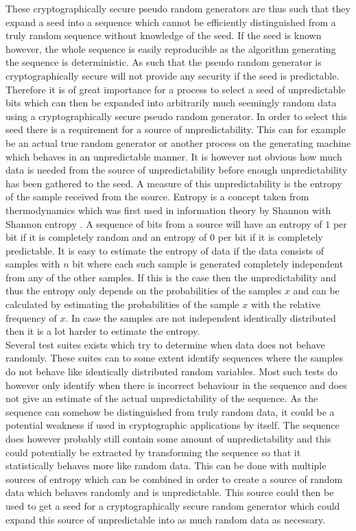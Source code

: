 \documentclass[a4paper,11pt]{report}
\begin{document}
\noindent
These cryptographically secure pseudo random generators are thus such that 
they expand a seed into a sequence which cannot be efficiently distinguished 
from a truly random sequence without knowledge of the seed. If the seed is 
known however, the whole sequence is easily reproducible as the algorithm 
generating the sequence is deterministic. As such that the pseudo random
generator is cryptographically secure will not provide any security if the seed
is predictable. Therefore it is of great importance for a process to select a 
seed of unpredictable bits which can then be expanded into arbitrarily much 
seemingly random data using a cryptographically secure pseudo random generator.
In order to select
this seed there is a requirement for a source of unpredictability. This can
for example be an actual true random generator or another process on the 
generating machine which behaves in an unpredictable manner. It is however not
obvious how much data is needed from the source of unpredictability before 
enough unpredictability has been gathered to the seed. A measure of this 
unpredictability is the entropy of the sample received from the source.
Entropy is a concept taken from thermodynamics which was first used in 
information theory by Shannon with Shannon entropy
\cite{Shannon:2001:MTC:584091.584093}.
A sequence of bits from a source will have an entropy of $1$ per bit if
it is completely random and an entropy of $0$ per bit if it is 
completely predictable. It is easy to estimate the entropy of 
data if the data consists of samples with $n$ bit where each such sample is
generated completely independent from any of the other samples. If this is the 
case then the unpredictability and thus the entropy only depends on the 
probabilities of the samples $x$ and can be calculated by estimating the
probabilities of the sample $x$ with the relative frequency of $x$. 
In case the samples are not independent identically distributed then it is a 
lot harder to estimate the entropy. \\

\noindent
Several test suites exists which try to determine when data does not behave 
randomly\cite{Ecuyer2007}\cite{Bassham:2010:SRS:2206233}. These suites can to some extent 
identify sequences where the samples do not behave like identically distributed
random variables. Most such tests do however only identify when there is 
incorrect behaviour in the sequence and does not give an estimate of the actual
unpredictability of the sequence. As the sequence can somehow be distinguished 
from truly random data, it could be a potential weakness if used in 
cryptographic applications by itself. The sequence does however probably still
contain some amount of unpredictability and this could potentially be extracted
by transforming the sequence so that it statistically behaves more like random
data. This can be done with multiple sources of entropy which can be combined 
in order to create a source of random data which behaves randomly and is 
unpredictable. This source could then be used to get a seed for a
cryptographically secure random generator which could expand this source of 
unpredictable into as much random data as necessary.\\
\end{document}
